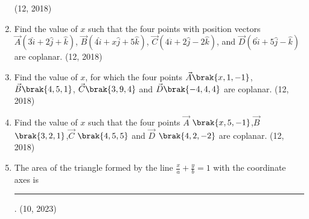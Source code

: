 \begin{enumerate}[label=\thesubsection.\arabic*, ref=\thesubsection.\theenumi]
	\hfill (12, 2018)
\item Find the value of $x$ such that the four points with position vectors $\vec{A}(3\hat{i} + 2\hat{j} + \hat{k})$, $\vec{B}(4\hat{i} + x\hat{j} + 5\hat{k})$, $\vec{C}(4\hat{i} + 2\hat{j} - 2\hat{k})$, and $\vec{D}(6\hat{i} + 5\hat{j} - \hat{k})$ are coplanar. \hfill (12, 2018)
\item Find the value of $x$, for which the four points $\vec{A}\brak{x,1,-1}$, $\vec{B}\brak{4,5,1}$, $\vec{C}\brak{3,9,4}$ and $\vec{D}\brak{-4,4,4}$ are coplanar.
\hfill (12, 2018)
\item  Find the value of $x$ such that the four points $\vec{A}$ $\brak{x,5,-1}$,$\vec{B}$ $\brak{3,2,1}$,$\vec{C}$ $\brak{4,5,5}$ and $\vec{D}$ $\brak{4,2,-2}$ are coplanar.
\hfill (12, 2018) 
    \item The area of the triangle formed by the line $ \frac{x}{a} + \frac{y}{b} = 1 $ with the coordinate axes is 
\rule{1cm}{0.1pt}.
    \hfill (10, 2023)
\end{enumerate}
